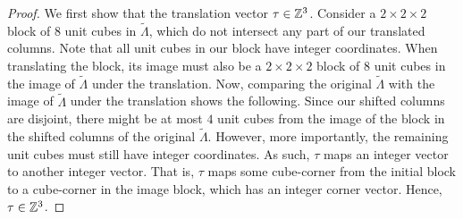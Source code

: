 \documentclass[../thesis.tex]{subfiles}
\begin{document}
\begin{proof}
We first show that the translation vector $\tau \in \mathbb{Z}^3$. Consider a $2\times 2\times 2$ block of $8$ unit cubes in $\widetilde{\Lambda}$, which do not intersect any part of our translated columns. Note that all unit cubes in our block have integer coordinates. When translating the block, its image must also be a $2\times 2\times 2$ block of $8$ unit cubes in the image of $\widetilde{\Lambda}$ under the translation. Now, comparing the original $\widetilde{\Lambda}$ with the image of $\widetilde{\Lambda}$ under the translation shows the following. Since our shifted columns are disjoint, there might be at most $4$ unit cubes from the image of the block in the shifted columns of the original $\widetilde{\Lambda}$. However, more importantly, the remaining unit cubes must still have integer coordinates. As such, $\tau$ maps an integer vector to another integer vector. That is, $\tau$ maps some cube-corner from the initial block to a cube-corner in the image block, which has an integer corner vector. Hence, $\tau \in \mathbb{Z}^3$. 


\end{proof}
\end{document}
